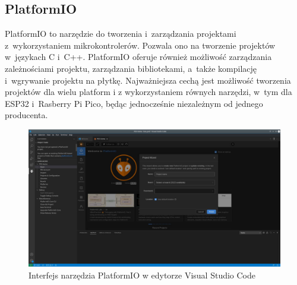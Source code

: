 \subsection{PlatformIO}
PlatformIO to narzędzie do tworzenia i~zarządzania projektami z~wykorzystaniem mikrokontrolerów. Pozwala ono na tworzenie projektów w~językach C i~C++. PlatformIO oferuje również możliwość zarządzania zależnościami projektu, zarządzania bibliotekami, a~także kompilację i~wgrywanie projektu na płytkę. Najważniejsza cechą jest możliwość tworzenia projektów dla wielu platform i z wykorzystaniem równych narzędzi, w~tym dla ESP32 i~Rasberry Pi Pico, będąc jednocześnie niezależnym od jednego producenta.~\cite{tool:pio}

\begin{figure}[b!]
    \begin{center}
        \includegraphics[width=15cm]{pic/pio.jpg}
    \end{center}
    \caption{Interfejs narzędzia PlatformIO w edytorze Visual Studio Code}\label{rys:pio}
\end{figure}
